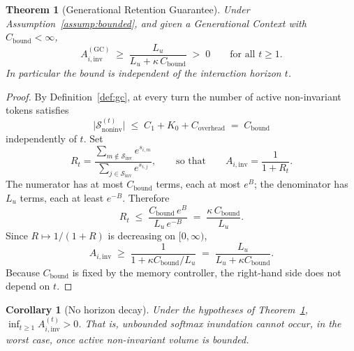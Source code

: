 ﻿\documentclass[11pt,a4paper]{article}
\theoremstyle{plain}
\newtheorem{theorem}{Theorem}
\newtheorem{corollary}{Corollary}
\theoremstyle{definition}
\theoremstyle{remark}
\begin{document}
\begin{theorem}[Generational Retention Guarantee]
\label{thm:retention}
Under Assumption~\ref{assump:bounded}, and given a Generational Context with
$C_{\mathrm{bound}} < \infty$,
\begin{equation}
  A_{i,\mathrm{inv}}^{(\mathrm{GC})}
  \;\ge\;
  \frac{L_u}{L_u + \kappa\, C_{\mathrm{bound}}}
  \;>\; 0
  \qquad \text{for all } t \ge 1 .
  \label{eq:retention}
\end{equation}
In particular the bound is independent of the interaction horizon $t$.
\end{theorem}

\begin{proof}
By Definition~\ref{def:gc}, at every turn the number of active non-invariant
tokens satisfies
\begin{equation}
  \bigl|\mathcal{S}_{\mathrm{noninv}}^{(t)}\bigr|
  \;\le\; C_1 + K_0 + C_{\mathrm{overhead}}
  \;=\; C_{\mathrm{bound}}
\end{equation}
independently of $t$. Set
\begin{equation}
  R_t
  = \frac{\sum_{m \notin \mathcal{S}_{\mathrm{inv}}} e^{s_{i,m}}}
         {\sum_{j \in \mathcal{S}_{\mathrm{inv}}} e^{s_{i,j}}},
  \qquad\text{so that}\qquad
  A_{i,\mathrm{inv}} = \frac{1}{1 + R_t}.
\end{equation}
The numerator has at most $C_{\mathrm{bound}}$ terms, each at most $e^{B}$; the
denominator has $L_u$ terms, each at least $e^{-B}$. Therefore
\begin{equation}
  R_t
  \;\le\;
  \frac{C_{\mathrm{bound}}\, e^{B}}{L_u\, e^{-B}}
  \;=\;
  \frac{\kappa\, C_{\mathrm{bound}}}{L_u}.
\end{equation}
Since $R \mapsto 1/(1+R)$ is decreasing on $[0,\infty)$,
\begin{equation}
  A_{i,\mathrm{inv}}
  \;\ge\;
  \frac{1}{1 + \kappa C_{\mathrm{bound}}/L_u}
  \;=\;
  \frac{L_u}{L_u + \kappa C_{\mathrm{bound}}} .
\end{equation}
Because $C_{\mathrm{bound}}$ is fixed by the memory controller, the right-hand
side does not depend on $t$.
\end{proof}

\begin{corollary}[No horizon decay]
\label{cor:no-decay}
Under the hypotheses of Theorem~\ref{thm:retention},
$\inf_{t \ge 1} A_{i,\mathrm{inv}}^{(t)} > 0$. That is, unbounded softmax
inundation cannot occur, in the worst case, once active non-invariant volume is
bounded.
\end{corollary}
\end{document}
